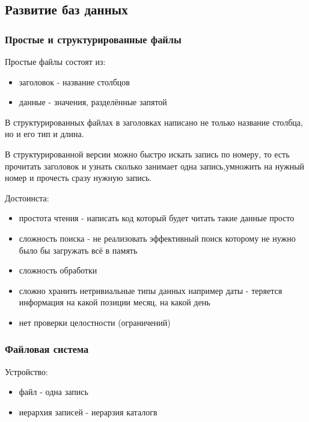 \subsection{Развитие баз данных}
\subsubsection{Простые и структурированные файлы}
Простые файлы состоят из:
\begin{itemize}
    \item заголовок - название столбцов
    \item данные - значения, разделённые запятой
\end{itemize}
В структурированных файлах в заголовках написано не только название столбца, но и его тип
и длина.

\begin{remark}
В структурированной версии можно быстро искать запись по номеру, то есть прочитать
заголовок и узнать сколько занимает одна запись,умножить на нужный номер и прочесть
сразу нужную запись.
\end{remark}

Достоинста:
\begin{itemize}
    \item простота чтения - написать код который будет читать такие данные просто
\end{itemize}

\begin{itemize}
    \item сложность поиска - не реализовать эффективный поиск
которому не нужно было бы загружать всё в память
    \item сложность обработки
    \item сложно хранить нетривиальные типы данных
например даты - теряется информация на какой позиции месяц, на какой день
    \item нет проверки целостности  (ограничений)
\end{itemize}

\subsubsection{Файловая система}
Устройство:
\begin{itemize}
    \item файл - одна запись
    \item иерархия записей - иерарзия каталогв
\end{itemize}

